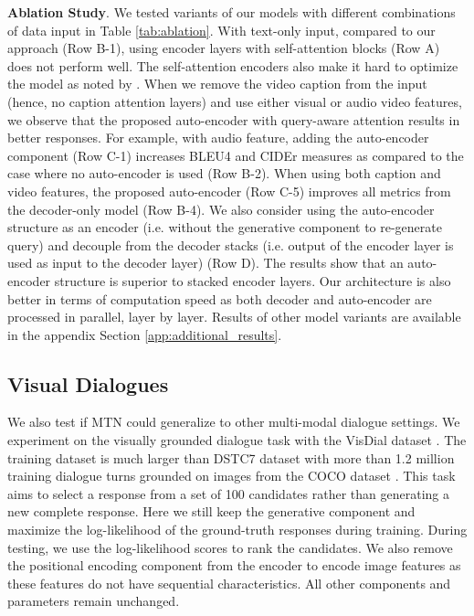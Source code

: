 \documentclass[11pt,a4paper]{article}
\begin{document}
\noindent\textbf{Ablation Study}. We tested variants of our models with different combinations of data input in Table \ref{tab:ablation}. With text-only input, compared to our approach (Row B-1), using encoder layers with self-attention blocks (Row A) does not perform well. 
The self-attention encoders also make it hard to optimize the model as noted by \cite{liu2018generating}. When we remove the video caption from the input (hence, no caption attention layers) and use either visual or audio video features, we observe that the proposed auto-encoder with query-aware attention results in better responses. For example, with audio feature, adding the auto-encoder component (Row C-1) increases BLEU4 and CIDEr measures as compared to the case where no auto-encoder is used (Row B-2). When using both caption and video features, the proposed auto-encoder (Row C-5) improves all metrics from the decoder-only model (Row B-4). We also consider using the auto-encoder structure as an encoder (i.e. without the generative component to re-generate query) and decouple from the decoder stacks (i.e. output of the  encoder layer is used as input to the  decoder layer) (Row D). The results show that an auto-encoder structure is superior to stacked encoder layers. Our architecture is also better in terms of computation speed as both decoder and auto-encoder are processed in parallel, layer by layer. Results of other model variants are available in the appendix Section \ref{app:additional_results}. 

\subsection{Visual Dialogues}

We also test if MTN could generalize to other multi-modal dialogue settings. We experiment on the visually grounded dialogue task with the VisDial dataset \cite{das2017visual}. The training dataset is much larger than DSTC7 dataset with more than 1.2 million training dialogue turns grounded on images from the COCO dataset \cite{lin2014microsoft}. This task aims to select a response from a set of 100 candidates rather than generating a new complete response. Here we still keep the generative component and maximize the log-likelihood of the ground-truth responses during training. During testing, we use the log-likelihood scores to rank the candidates. We also remove the positional encoding component from the encoder to encode image features as these features do not have sequential characteristics. All other components and parameters remain unchanged. 
\end{document}
